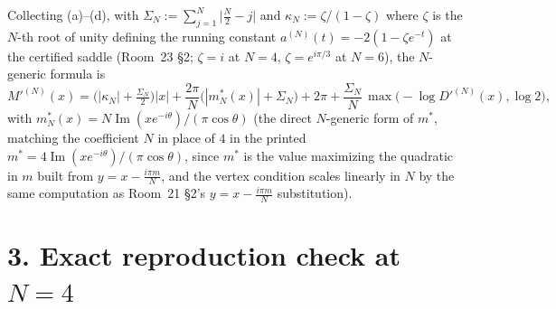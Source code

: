 \documentclass[11pt]{article}
\begin{document}
Collecting (a)--(d), with $\Sigma_N:=\sum_{j=1}^N\bigl|\frac N2-j\bigr|$ and $\kappa_N:=\zeta/(1-\zeta)$
where $\zeta$ is the $N$-th root of unity defining the running constant $a^{(N)}(t)=-2(1-\zeta e^{-t})$
at the certified saddle (Room~23 \S2; $\zeta=i$ at $N=4$, $\zeta=e^{i\pi/3}$ at $N=6$), the
$N$-generic formula is
\[
 \boxed{M'^{(N)}(x)=\bigl(|\kappa_N|+\tfrac{\Sigma_N}2\bigr)|x|+\frac{2\pi}N\bigl(|m^\ast_N(x)|+\Sigma_N\bigr)
 +2\pi+\frac{\Sigma_N}N\,\max\bigl(-\log D'^{(N)}(x),\log2\bigr)},
\]
with $m^\ast_N(x)=N\operatorname{Im}(xe^{-i\theta})/(\pi\cos\theta)$ (the direct $N$-generic form
of $m^\ast$, matching the coefficient $N$ in place of $4$ in the printed $m^\ast=4\operatorname{Im}
(xe^{-i\theta})/(\pi\cos\theta)$, since $m^\ast$ is the value maximizing the quadratic in $m$ built
from $y=x-\frac{i\pi m}N$, and the vertex condition scales linearly in $N$ by the same computation
as Room~21 \S2's $y=x-\frac{i\pi m}N$ substitution).

\section*{3. Exact reproduction check at $N=4$}
\end{document}
